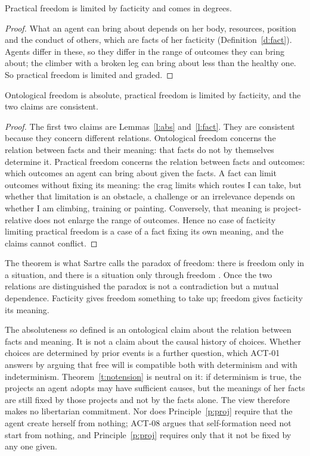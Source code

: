 \documentclass{situationist-preprint}
\begin{document}
\begin{lemma}[Facticity]\label{l:fact}
Practical freedom is limited by facticity and comes in degrees.
\end{lemma}

\begin{proof}
What an agent can bring about depends on her body, resources, position and the conduct of others, which are facts of her facticity (Definition~\ref{d:fact}). Agents differ in these, so they differ in the range of outcomes they can bring about; the climber with a broken leg can bring about less than the healthy one. So practical freedom is limited and graded.
\end{proof}

\begin{theorem}[No tension]\label{t:notension}
Ontological freedom is absolute, practical freedom is limited by facticity, and the two claims are consistent.
\end{theorem}

\begin{proof}
The first two claims are Lemmas~\ref{l:abs} and~\ref{l:fact}. They are consistent because they concern different relations. Ontological freedom concerns the relation between facts and their meaning: that facts do not by themselves determine it. Practical freedom concerns the relation between facts and outcomes: which outcomes an agent can bring about given the facts. A fact can limit outcomes without fixing its meaning: the crag limits which routes I can take, but whether that limitation is an obstacle, a challenge or an irrelevance depends on whether I am climbing, training or painting. Conversely, that meaning is project-relative does not enlarge the range of outcomes. Hence no case of facticity limiting practical freedom is a case of a fact fixing its own meaning, and the claims cannot conflict.
\end{proof}

The theorem is what Sartre calls the paradox of freedom: there is freedom only in a situation, and there is a situation only through freedom \citep[Part~IV, ch.~1]{Sartre1943}. Once the two relations are distinguished the paradox is not a contradiction but a mutual dependence. Facticity gives freedom something to take up; freedom gives facticity its meaning.

The absoluteness so defined is an ontological claim about the relation between facts and meaning. It is not a claim about the causal history of choices. Whether choices are determined by prior events is a further question, which ACT-01 answers by arguing that free will is compatible both with determinism and with indeterminism. Theorem~\ref{t:notension} is neutral on it: if determinism is true, the projects an agent adopts may have sufficient causes, but the meanings of her facts are still fixed by those projects and not by the facts alone. The view therefore makes no libertarian commitment. Nor does Principle~\ref{p:proj} require that the agent create herself from nothing; ACT-08 argues that self-formation need not start from nothing, and Principle~\ref{p:proj} requires only that it not be fixed by any one given.
\end{document}
